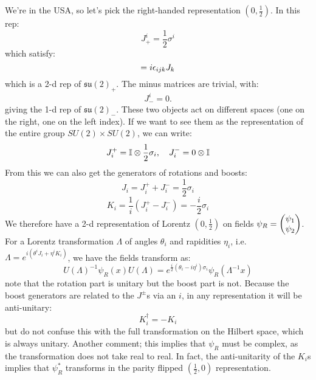 We're in the USA, so let's pick the right-handed representation $(0, \frac{1}{2})$. In this rep:
\begin{equation}
    J_+^i = \frac{1}{2}\sigma^i
\end{equation}
which satisfy:
\begin{equation}
    [J_+^i, J_+^j] = i\e_{ijk}J_k
\end{equation}
which is a 2-d rep of $\mathfrak{su}(2)_+$. The minus matrices are trivial, with:
\begin{equation}
    J_-^i = 0.
\end{equation}
giving the 1-d rep of $\mathfrak{su}(2)_-$. These two objects act on different spaces (one on the right, one on the left index). If we want to see them as the representation of the entire group $SU(2) \times SU(2)$, we can write:
\begin{equation}
    J_i^+ = \mathbb{I} \otimes \frac{1}{2}\sigma_i, \quad J_i^- = 0 \otimes \mathbb{I}
\end{equation}
From this we can also get the generators of rotations and boosts:
\begin{equation}
    J_i = J_i^+ + J_i^- = \frac{1}{2}\sigma_i
\end{equation}
\begin{equation}
    K_i = \frac{1}{i}(J_i^+ - J_i^-) = -\frac{i}{2}\sigma_i
\end{equation}
We therefore have a 2-d representation of Lorentz $(0, \frac{1}{2})$ on fields $\psi_R = \begin{pmatrix}\psi_1 \\ \psi_2\end{pmatrix}$. For a Lorentz transformation $\Lambda$ of angles $\theta_i$ and rapidities $\eta_i$, i.e. $\Lambda = e^{i(\theta^i J_i + \eta^i K_i)}$, we have the fields transform as:
\begin{equation}
    U(\Lambda)^{-1}\psi_R(x)U(\Lambda) = e^{\frac{i}{2}(\theta_i - i\eta^i)\sigma_i}\psi_R(\Lambda^{-1}x)
\end{equation}
note that the rotation part is unitary but the boost part is not. Because the boost generators are related to the $J^\pm$s via an $i$, in any representation it will be anti-unitary:
\begin{equation}
    K_i^\dagger = -K_i
\end{equation}
but do not confuse this with the full transformation on the Hilbert space, which is always unitary. Another comment; this implies that $\psi_R$ must be complex, as the transformation does not take real to real. In fact, the anti-unitarity of the $K_i$s implies that $\psi_R^*$ transforms in the parity flipped $(\frac{1}{2}, 0)$ representation.

